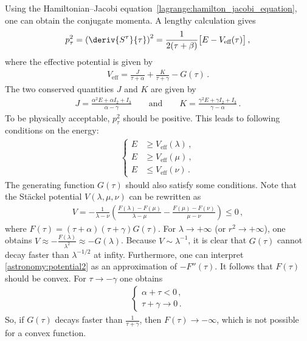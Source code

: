     Using the Hamiltonian--Jacobi equation~\eqref{lagrange:hamilton_jacobi_equation}, one can obtain the conjugate momenta. A lengthy calculation gives
    \begin{gather}
        p_\tau^2 = \left(\deriv{S^\tau}{\tau}\right)^2 = \frac{1}{2(\tau+\beta)}\bigl[E - V_{\text{eff}}(\tau)\bigr]\,,
    \end{gather}
    where the effective potential is given by
    \begin{gather}
        V_{\text{eff}} = \frac{J}{\tau+\alpha} + \frac{K}{\tau+\gamma} - G(\tau)\,.
    \end{gather}
    The two conserved quantities $J$ and $K$ are given by
    \begin{gather}
        J = \frac{\alpha^2E + \alpha I_2 + I_3}{\alpha - \gamma} \qquad\text{and}\qquad K = \frac{\gamma^2E + \gamma I_2 + I_3}{\gamma - \alpha}\,.
    \end{gather}
    To be physically acceptable, $p_\tau^2$ should be positive. This leads to following conditions on the energy:
    \begin{gather}
        \begin{cases}
            E&\geq V_{\text{eff}}(\lambda)\,,\\
            E&\geq V_{\text{eff}}(\mu)\,,\\
            E&\leq V_{\text{eff}}(\nu)\,.
        \end{cases}
    \end{gather}
    The generating function $G(\tau)$ should also satisfy some conditions. Note that the St\"ackel potential $V(\lambda,\mu,\nu)$ can be rewritten as
    \begin{gather}
        \label{astronomy:potential2}
        V = -\frac{1}{\lambda - \nu}\left(\frac{F(\lambda) - F(\mu)}{\lambda - \mu} - \frac{F(\mu) - F(\nu)}{\mu - \nu}\right) \leq 0\,,
    \end{gather}
    where $F(\tau) = (\tau + \alpha)(\tau + \gamma)G(\tau)$. For $\lambda\longrightarrow+\infty$ (or $r^2\longrightarrow+\infty$), one obtains $V\approx-\frac{F(\lambda)}{\lambda^2}\approx-G(\lambda)$. Because $V\sim \lambda^{-1}$, it is clear that $G(\tau)$ cannot decay faster than $\lambda^{-1/2}$ at infity. Furthermore, one can interpret \cref{astronomy:potential2} as an approximation of $-F''(\tau)$. It follows that $F(\tau)$ should be convex. For $\tau\longrightarrow-\gamma$ one obtains
    \begin{gather}
        \begin{cases}
            \alpha + \tau < 0\,,\\
            \tau + \gamma\longrightarrow 0\,.
        \end{cases}
    \end{gather}
    So, if $G(\tau)$ decays faster than $\frac{1}{\tau + \gamma}$, then $F(\tau)\longrightarrow-\infty$, which is not possible for a convex function.

